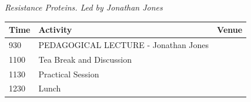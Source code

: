 \documentclass[12pt,]{book}
\begin{document}
\emph{Resistance Proteins. Led by Jonathan Jones}

\begin{longtable}[]{@{}lll@{}}
\toprule
\begin{minipage}[b]{0.09\columnwidth}\raggedright\strut
Time\strut
\end{minipage} & \begin{minipage}[b]{0.39\columnwidth}\raggedright\strut
Activity\strut
\end{minipage} & \begin{minipage}[b]{0.39\columnwidth}\raggedright\strut
Venue\strut
\end{minipage}\tabularnewline
\midrule
\endhead
\begin{minipage}[t]{0.09\columnwidth}\raggedright\strut
930\strut
\end{minipage} & \begin{minipage}[t]{0.39\columnwidth}\raggedright\strut
PEDAGOGICAL LECTURE - Jonathan Jones\strut
\end{minipage} & \begin{minipage}[t]{0.39\columnwidth}\raggedright\strut
\strut
\end{minipage}\tabularnewline
\begin{minipage}[t]{0.09\columnwidth}\raggedright\strut
1100\strut
\end{minipage} & \begin{minipage}[t]{0.39\columnwidth}\raggedright\strut
Tea Break and Discussion\strut
\end{minipage} & \begin{minipage}[t]{0.39\columnwidth}\raggedright\strut
\strut
\end{minipage}\tabularnewline
\begin{minipage}[t]{0.09\columnwidth}\raggedright\strut
1130\strut
\end{minipage} & \begin{minipage}[t]{0.39\columnwidth}\raggedright\strut
Practical Session\strut
\end{minipage} & \begin{minipage}[t]{0.39\columnwidth}\raggedright\strut
\strut
\end{minipage}\tabularnewline
\begin{minipage}[t]{0.09\columnwidth}\raggedright\strut
1230\strut
\end{minipage} & \begin{minipage}[t]{0.39\columnwidth}\raggedright\strut
Lunch\strut
\end{minipage} & \begin{minipage}[t]{0.39\columnwidth}\raggedright\strut

\end{minipage}
\end{longtable}
\end{document}
